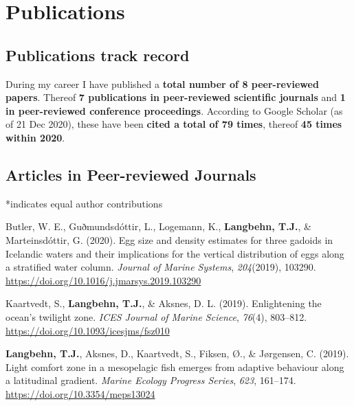 \documentclass[11pt, a4paper]{awesome-cv}
\begin{document}
\hypertarget{publications}{%
\section{Publications}\label{publications}}

\hypertarget{publications-track-record}{%
\subsection{Publications track record}\label{publications-track-record}}

During my career I have published a \textbf{total number of 8
peer-reviewed papers}. Thereof \textbf{7 publications in peer-reviewed
scientific journals} and \textbf{1 in peer-reviewed conference
proceedings}. According to Google Scholar (as of 21 Dec 2020), these
have been \textbf{cited a total of 79 times}, thereof \textbf{45 times
within 2020}.

\hypertarget{articles-in-peer-reviewed-journals}{%
\subsection{Articles in Peer-reviewed
Journals}\label{articles-in-peer-reviewed-journals}}

*indicates equal author contributions

\begingroup
\setlength{\parindent}{-0.5in}
\setlength{\leftskip}{0.5in}

\hypertarget{refs_journals}{}
\leavevmode\hypertarget{ref-Butler2020}{}%
Butler, W. E., Guðmundsdóttir, L., Logemann, K.,
\textbf{Langbehn, T.J.}, \& Marteinsdóttir, G. (2020). Egg size and
density estimates for three gadoids in Icelandic waters and their
implications for the vertical distribution of eggs along a stratified
water column. \emph{Journal of Marine Systems}, \emph{204}(2019),
103290. \url{https://doi.org/10.1016/j.jmarsys.2019.103290}

\leavevmode\hypertarget{ref-Kaartvedt2019b}{}%
Kaartvedt, S., \textbf{Langbehn, T.J.}, \& Aksnes, D. L. (2019).
Enlightening the ocean's twilight zone. \emph{ICES Journal of Marine
Science}, \emph{76}(4), 803--812.
\url{https://doi.org/10.1093/icesjms/fsz010}

\leavevmode\hypertarget{ref-Langbehn2019a}{}%
\textbf{Langbehn, T.J.}, Aksnes, D., Kaartvedt, S., Fiksen, Ø., \&
Jørgensen, C. (2019). Light comfort zone in a mesopelagic fish emerges
from adaptive behaviour along a latitudinal gradient. \emph{Marine
Ecology Progress Series}, \emph{623}, 161--174.
\url{https://doi.org/10.3354/meps13024}
\end{document}
